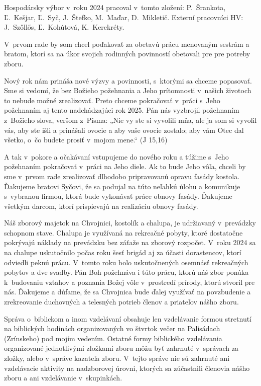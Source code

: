 


Hospodársky výbor v~roku 2024 pracoval v~tomto zložení: P.~Šrankota, Ľ.~Kešjar, Ľ.~Syč, J.~Štefko, M.~Maďar, D.~Mikletič. Externí pracovníci HV: J.~Szőllős, Ľ.~Kohútová, K.~Kerekréty.

V~prvom rade by som chcel poďakovať za obetavú prácu menovaným sestrám a bratom, ktorí sa na úkor svojich rodinných povinností obetovali pre pre potreby zboru.

Nový rok nám prináša nové výzvy a povinnosti, s~ktorými sa chceme popasovať. Sme si vedomí, že bez Božieho požehnania a Jeho prítomnosti v~našich životoch to nebude možné zrealizovať. Preto chceme pokračovať v~práci s~Jeho požehnaním aj tento nadchádzajúci rok 2025. Pán nás vyzbrojil požehnaním z~Božieho slova, veršom z~Písma: „Nie vy ste si vyvolili mňa, ale ja som si vyvolil vás, aby ste išli a prinášali ovocie a aby vaše ovocie zostalo; aby vám Otec dal všetko, o~čo budete prosiť v~mojom mene.“ (J 15,16)

A tak v~pokore a očakávaní vstupujeme do nového roku a túžime s~Jeho požehnaním pokračovať v~práci na Jeho diele. Ak to bude Jeho vôľa, chceli by sme v~prvom rade zrealizovať dlhodobo pripravovanú opravu fasády kostola. Ďakujeme bratovi Syčovi, že sa podujal na túto neľahkú úlohu a komunikuje s~vybranou firmou, ktorá bude vykonávať práce obnovy fasády. Ďakujeme všetkým darcom, ktorí prispievajú na realizáciu obnovy fasády.

Náš zborový majetok na Chvojnici, kostolík a chalupa, je udržiavaný v~prevádzky schopnom stave. Chalupa je využívaná na rekreačné pobyty, ktoré dostatočne pokrývajú náklady na prevádzku bez záťaže na zborový rozpočet. V~roku 2024 sa na chalupe uskutočnilo počas roku šesť brigád aj za účasti dorastencov, ktorí odviedli peknú prácu. V~tomto roku bolo uskutočnených osemnásť rekreačných pobytov a dve svadby. Pán Boh požehnáva i túto prácu, ktorú náš zbor ponúka k~budovaniu vzťahov a poznania Božej vôle v~prostredí prírody, ktorú stvoril pre nás. Ďakujeme a dúfame, že sa Chvojnica bude ďalej využívať na povzbudenie a zrekreovanie duchovných a telesných potrieb členov a priateľov nášho zboru.




Správa o~biblickom a inom vzdelávaní obsahuje len vzdelávanie formou stretnutí na biblických hodinách organizovaných vo štvrtok večer na Palisádach (Zrínskeho) pod mojím vedením. Ostatné formy biblického vzdelávania organizované jednotlivými zložkami zboru môžu byť zahrnuté v~správach za zložky, alebo v~správe kazateľa zboru. V~tejto správe nie sú zahrnuté ani vzdelávacie aktivity na nadzborovej úrovni, ktorých sa zúčastnili členovia nášho zboru a ani vzdelávanie v~skupinkách.


